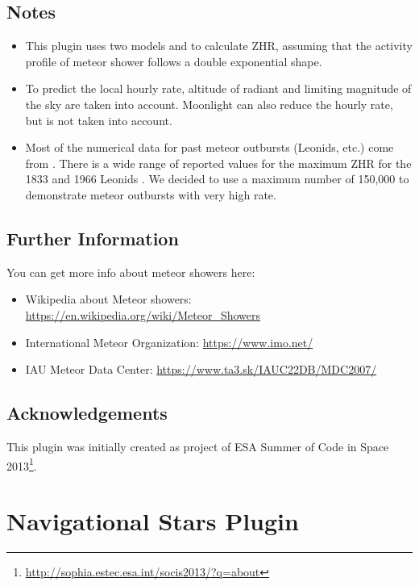 \subsection{Notes}
\begin{itemize}
\item This plugin uses two models \citep{1994A&A...287..990J} and \citep{1998Jenniskens} to calculate ZHR,
  assuming that the activity profile of meteor shower follows a double exponential shape.
\item To predict the local hourly rate, altitude of radiant and limiting magnitude of the sky are taken into account.
  Moonlight can also reduce the hourly rate, but is not taken into account.
\item Most of the numerical data for past meteor outbursts (Leonids, etc.) come from \citep{2006Jenniskens.book}.
  There is a wide range of reported values for the maximum ZHR for the 1833 and 1966 Leonids \citep{1999Brown}.
  We decided to use a maximum number of 150,000 to demonstrate meteor outbursts with very high rate.
\end{itemize}

\subsection{Further Information}
\label{sec:plugins:MeteorShowers:Further}

You can get more info about meteor showers here:
\begin{itemize}
\item Wikipedia about Meteor showers: \url{https://en.wikipedia.org/wiki/Meteor_Showers}
\item International Meteor Organization: \url{https://www.imo.net/}
\item IAU Meteor Data Center: \url{https://www.ta3.sk/IAUC22DB/MDC2007/}
\end{itemize}

\subsection*{Acknowledgements}
This plugin was initially created as project of ESA Summer of Code in Space 2013\footnote{\url{http://sophia.estec.esa.int/socis2013/?q=about}}.


\newpage

\section{Navigational Stars Plugin}
\label{sec:plugins:NavigationalStars}

